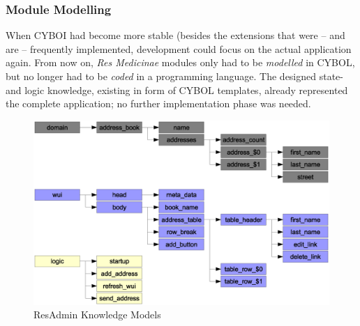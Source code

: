 %
%
%
%
%
%
%

\subsubsection{Module Modelling}
\label{module_modelling_heading}

When CYBOI had become more stable (besides the extensions that were -- and are
-- frequently implemented, development could focus on the actual application
again. From now on, \emph{Res Medicinae} modules only had to be \emph{modelled}
in CYBOL, but no longer had to be \emph{coded} in a programming language. The
designed state- and logic knowledge, existing in form of CYBOL templates,
already represented the complete application; no further implementation phase
was needed.

\begin{figure}[ht]
    \begin{center}
        \includegraphics[scale=0.2]{vector/radesign.eps}
        \caption{ResAdmin Knowledge Models}
        \label{radesign_figure}
    \end{center}
\end{figure}

